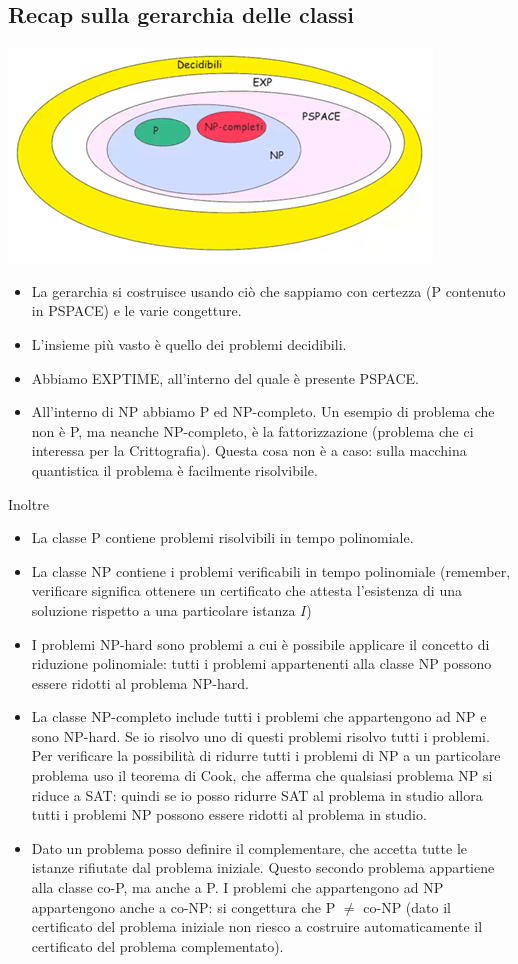 \subsection{Recap sulla gerarchia delle classi}
\begin{center}
	\includegraphics[scale=.8]{images/5.PNG}
\end{center}
\begin{itemize}
	\item La gerarchia si costruisce usando ciò che sappiamo con certezza (P contenuto in PSPACE) e le varie congetture.
	\item L’insieme più vasto è quello dei problemi decidibili.
	\item Abbiamo EXPTIME, all’interno del quale è presente PSPACE.
	\item All’interno di NP abbiamo P ed NP-completo. Un esempio di problema che non è P, ma neanche NP-completo, è la fattorizzazione (problema che ci interessa per la Crittografia). Questa cosa non è a caso: sulla macchina quantistica il problema è facilmente risolvibile.
\end{itemize}
Inoltre
\begin{itemize}
\item La classe P contiene problemi risolvibili in tempo polinomiale.
\item La classe NP contiene i problemi verificabili in tempo polinomiale (remember, verificare significa ottenere un certificato che attesta l'esistenza di una soluzione rispetto a una particolare istanza $I$)
\item I problemi NP-hard sono problemi a cui è possibile applicare il concetto di riduzione polinomiale: tutti i problemi appartenenti alla classe NP possono essere ridotti al problema NP-hard.
\item La classe NP-completo include tutti i problemi che appartengono ad NP e sono NP-hard. Se io risolvo uno di questi problemi risolvo tutti i problemi. Per verificare la possibilità di ridurre tutti i problemi di NP a un particolare problema uso il teorema di Cook, che afferma che qualsiasi problema NP si riduce a SAT: quindi se io posso ridurre SAT al problema in studio allora tutti i problemi NP possono essere ridotti al problema in studio.
\item Dato un problema posso definire il complementare, che accetta tutte le istanze rifiutate dal problema iniziale. Questo secondo problema appartiene alla classe co-P, ma anche a P. I problemi che appartengono ad NP appartengono anche a co-NP: si congettura che P $\neq$ co-NP (dato il certificato del problema iniziale non riesco a costruire automaticamente il certificato del problema complementato).
\end{itemize} 
